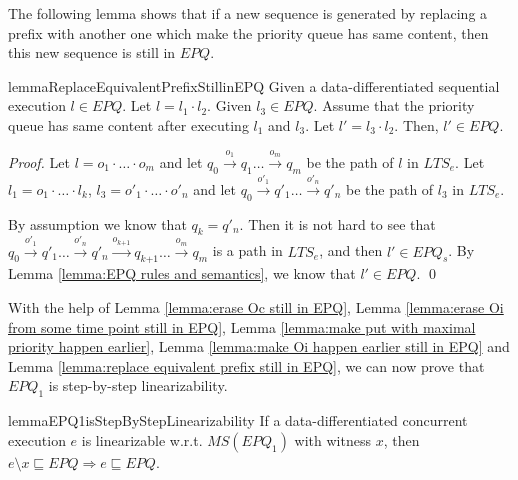 The following lemma shows that if a new sequence is generated by replacing a prefix with another one which make the priority queue has same content, then this new sequence is still in $\textit{EPQ}$.

\begin{restatable}{lemma}{ReplaceEquivalentPrefixStillinEPQ}
\label{lemma:replace equivalent prefix still in EPQ}
Given a data-differentiated sequential execution $l \in \textit{EPQ}$. Let $l=l_1 \cdot l_2$. Given $l_3 \in \textit{EPQ}$. Assume that the priority queue has same content after executing $l_1$ and $l_3$. Let $l' = l_3 \cdot l_2$. Then, $l' \in \textit{EPQ}$.
\end{restatable}

\begin {proof}
Let $l=o_1 \cdot \ldots \cdot o_m$ and let $q_0 \xrightarrow{o_1} q_1 \ldots \xrightarrow{o_m} q_m$ be the path of $l$ in $\textit{LTS}_e$. Let $l_1 = o_1 \cdot \ldots \cdot l_k$, $l_3 = o'_1 \cdot \ldots \cdot o'_n$ and let $q_0 \xrightarrow{o'_1} q'_1 \ldots \xrightarrow{o'_n} q'_n$ be the path of $l_3$ in $\textit{LTS}_e$.

By assumption we know that $q_k = q'_n$. Then it is not hard to see that $q_0 \xrightarrow{o'_1} q'_1 \ldots \xrightarrow{o'_n} q'_n \xrightarrow{o_{\textit{k+1}}} q_{\textit{k+1}} \ldots \xrightarrow{o_m} q_m$ is a path in $\textit{LTS}_e$, and then $l' \in \textit{EPQ}_s$. By Lemma \ref{lemma:EPQ rules and semantics}, we know that $l' \in \textit{EPQ}$. \qed
\end {proof}

With the help of Lemma \ref{lemma:erase Oc still in EPQ}, Lemma \ref{lemma:erase Oi from some time point still in EPQ}, Lemma \ref{lemma:make put with maximal priority happen earlier}, Lemma \ref{lemma:make Oi happen earlier still in EPQ} and Lemma \ref{lemma:replace equivalent prefix still in EPQ}, we can now prove that $\textit{EPQ}_1$ is step-by-step linearizability.


\begin{restatable}{lemma}{EPQ1isStepByStepLinearizability}
\label{lemma:EPQ1 is step-by-step linearizability}
If a data-differentiated concurrent execution $e$ is linearizable w.r.t. $\textit{MS}(\textit{EPQ}_1)$ with witness $x$, then $e \setminus x \sqsubseteq \textit{EPQ} \Rightarrow e \sqsubseteq \textit{EPQ}$.
\end{restatable}

